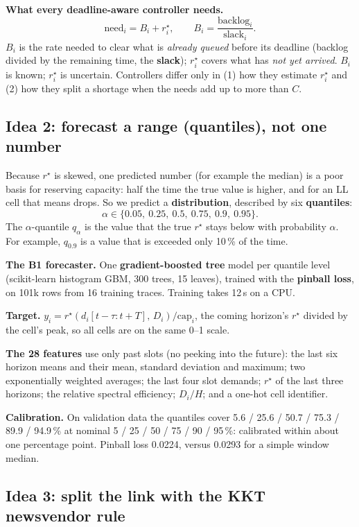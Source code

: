 \documentclass[11pt,a4paper]{article}
\newcommand{\rstar}{r^\star}
\begin{document}
\textbf{What every deadline-aware controller needs.}
\[
  \text{need}_i = B_i + \rstar_i, \qquad B_i = \frac{\text{backlog}_i}{\text{slack}_i}.
\]
$B_i$ is the rate needed to clear what is \emph{already queued} before its deadline (backlog divided by the remaining time, the \textbf{slack}); $\rstar_i$ covers what has \emph{not yet arrived}. $B_i$ is known; $\rstar_i$ is uncertain. Controllers differ only in (1) how they estimate $\rstar_i$ and (2) how they split a shortage when the needs add up to more than $C$.

\subsection{Idea 2: forecast a range (quantiles), not one number}

Because $\rstar$ is skewed, one predicted number (for example the median) is a poor basis for reserving capacity: half the time the true value is higher, and for an LL cell that means drops. So we predict a \textbf{distribution}, described by six \textbf{quantiles}:
\[ \alpha \in \{0.05,\ 0.25,\ 0.5,\ 0.75,\ 0.9,\ 0.95\}. \]
The $\alpha$-quantile $q_\alpha$ is the value that the true $\rstar$ stays below with probability $\alpha$. For example, $q_{0.9}$ is a value that is exceeded only 10\,\% of the time.

\textbf{The B1 forecaster.} One \textbf{gradient-boosted tree} model per quantile level (scikit-learn histogram GBM, 300 trees, 15 leaves), trained with the \textbf{pinball loss}, on 101k rows from 16 training traces. Training takes 12\,s on a CPU.

\textbf{Target.} $y_i = \rstar(d_i[t-\tau : t+T],\,D_i)/\mathrm{cap}_i$, the coming horizon's $\rstar$ divided by the cell's peak, so all cells are on the same 0--1 scale.

\textbf{The 28 features} use only past slots (no peeking into the future): the last six horizon means and their mean, standard deviation and maximum; two exponentially weighted averages; the last four slot demands; $\rstar$ of the last three horizons; the relative spectral efficiency; $D_i/H$; and a one-hot cell identifier.

\textbf{Calibration.} On validation data the quantiles cover 5.6 / 25.6 / 50.7 / 75.3 / 89.9 / 94.9\,\% at nominal 5 / 25 / 50 / 75 / 90 / 95\,\%: calibrated within about one percentage point. Pinball loss 0.0224, versus 0.0293 for a simple window median.

\subsection{Idea 3: split the link with the KKT newsvendor rule}
\end{document}

